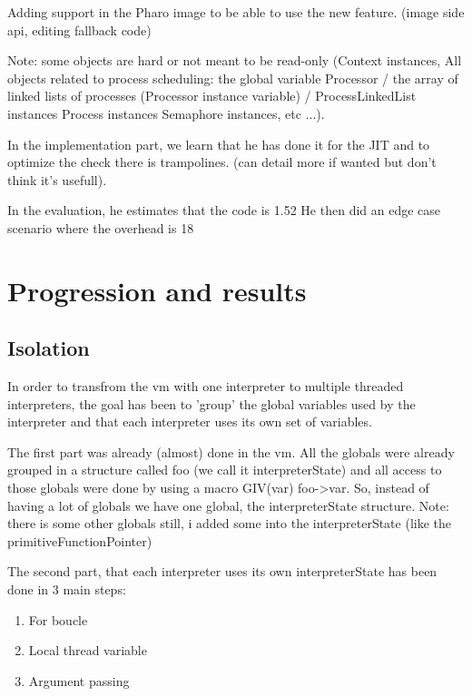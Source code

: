 \documentclass[11pt]{article} %
\begin{document}
    Adding support in the Pharo image to be able to use the new feature. (image side api, editing fallback code)

Note: some objects are hard or not meant to be read-only (Context instances, All objects related to process scheduling: the global variable Processor / the array of linked lists of processes (Processor instance variable) / ProcessLinkedList instances Process instances Semaphore instances, etc ...).

In the implementation part, we learn that he has done it for the JIT and to optimize the check there is trampolines. (can detail more if wanted but don't think it's usefull).

In the evaluation, he estimates that the code is 1.52%
He then did an edge case scenario where the overhead is 18%



\section{Progression and results}
\subsection{Isolation}
In order to transfrom the vm with one interpreter to multiple threaded interpreters, the goal has been to 'group' the global variables used by the interpreter and that each interpreter uses its own set of variables.

The first part was already (almost) done in the vm. All the globals were already grouped in a structure called foo (we call it interpreterState) and all access to those globals were done by using a macro GIV(var) foo->var. So, instead of having a lot of globals we have one global, the interpreterState structure.
Note: there is some other globals still, i added some into the interpreterState (like the primitiveFunctionPointer)

The second part, that each interpreter uses its own interpreterState has been done in 3 main steps:
\begin{enumerate}
   	 \item For boucle

   	 \item Local thread variable

	\item Argument passing
\end{enumerate}
\end{document}
